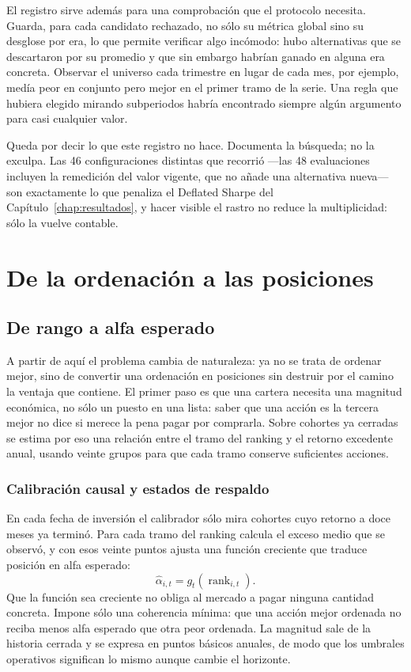 El registro sirve además para una comprobación que el protocolo necesita. Guarda, para cada candidato
rechazado, no sólo su métrica global sino su desglose por era, lo que permite verificar algo
incómodo: hubo alternativas que se descartaron por su promedio y que sin embargo habrían ganado en
alguna era concreta. Observar el universo cada trimestre en lugar de cada mes, por ejemplo, medía
peor en conjunto pero mejor en el primer tramo de la serie. Una regla que hubiera elegido mirando
subperiodos habría encontrado siempre algún argumento para casi cualquier valor.

Queda por decir lo que este registro no hace. Documenta la búsqueda; no la exculpa. Las 46
configuraciones distintas que recorrió ---las 48 evaluaciones incluyen la remedición del valor
vigente, que no añade una alternativa nueva--- son exactamente lo que penaliza el Deflated Sharpe del
Capítulo~\ref{chap:resultados}, y hacer visible el rastro no reduce la multiplicidad: sólo la vuelve
contable.

\section{De la ordenación a las posiciones}

\subsection{De rango a alfa esperado}

A partir de aquí el problema cambia de naturaleza: ya no se trata de ordenar mejor, sino de
convertir una ordenación en posiciones sin destruir por el camino la ventaja que contiene. El primer
paso es que una cartera necesita una magnitud económica, no sólo un puesto en una lista: saber que
una acción es la tercera mejor no dice si merece la pena pagar por comprarla. Sobre cohortes ya
cerradas se estima por eso una relación entre el tramo del ranking y el retorno excedente anual,
usando veinte grupos para que cada tramo conserve suficientes acciones.

\subsubsection*{Calibración causal y estados de respaldo}

En cada fecha de inversión el calibrador sólo mira cohortes cuyo retorno a doce meses ya terminó.
Para cada tramo del ranking calcula el exceso medio que se observó, y con esos veinte puntos ajusta
una función creciente que traduce posición en alfa esperado:
\[
 \widehat{\alpha}_{i,t}=g_t\!\left(\operatorname{rank}_{i,t}\right).
\]
Que la función sea creciente no obliga al mercado a pagar ninguna cantidad concreta. Impone sólo una
coherencia mínima: que una acción mejor ordenada no reciba menos alfa esperado que otra peor
ordenada. La magnitud sale de la historia cerrada y se expresa en puntos básicos anuales, de modo
que los umbrales operativos significan lo mismo aunque cambie el horizonte.


